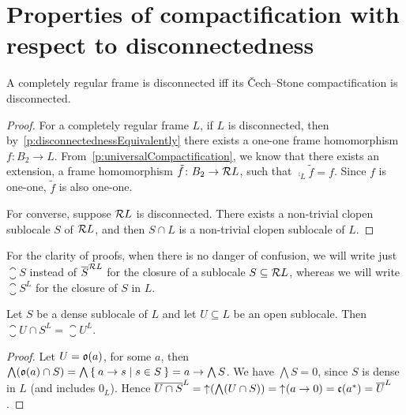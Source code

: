\section{Properties of compactification with respect to disconnectedness}

\begin{proposition}
    A completely regular frame is disconnected iff its Čech--Stone compactification is disconnected.
\end{proposition}
\begin{proof}
    For a completely regular frame $L$, if $L$ is disconnected, then by~\ref{p:disconnectednessEquivalently} there exists a one-one frame homomorphism $f\colon B_2\to L$. From~\ref{p:universalCompactification}, we know that there exists an extension, a frame homomorphism $\tilde f\colon B_2\to \mathcal{R} L$, such that $\comp_L \tilde f = f$. Since $f$ is one-one, $\tilde f$ is also one-one.

    For converse, suppose $\mathcal{R} L$ is disconnected. There exists a non-trivial clopen sublocale $S$ of $\mathcal{R} L$, and then $S\cap L$ is a non-trivial clopen sublocale of $L$.
\end{proof}

For the clarity of proofs, when there is no danger of confusion, we will write just $\closure{S}$ instead of $\overline{S}^{\mathcal{R} L}$ for the closure of a sublocale $S\subseteq \mathcal{R} L$, whereas we will write $\closure{S}^L$ for the closure of $S$ in $L$.

\begin{lemma}\label{p:closureIntersectedByDense}
    Let $S$ be a dense sublocale of $L$ and let $U\subseteq L$ be an open sublocale. Then $\closure{U\cap S}^L = \closure{U}^L$.
\end{lemma}
\begin{proof}
    Let $U = \mathfrak{o}(a)$, for some $a$, then $\bigwedge (\mathfrak{o}(a)\cap S) = \bigwedge \Set{ a\to s | s \in S } = a\to \bigwedge S$. We have $\bigwedge S = 0$, since $S$ is dense in $L$ (and includes $0_L$). Hence $\overline{U\cap S}^L = \mathord{\uparrow}\mkern1mu (\bigwedge (U\cap S)) = \mathord{\uparrow}\mkern1mu(a\to 0) = \mathfrak{c}(a^*) = \overline{U}^L$.
\end{proof}

